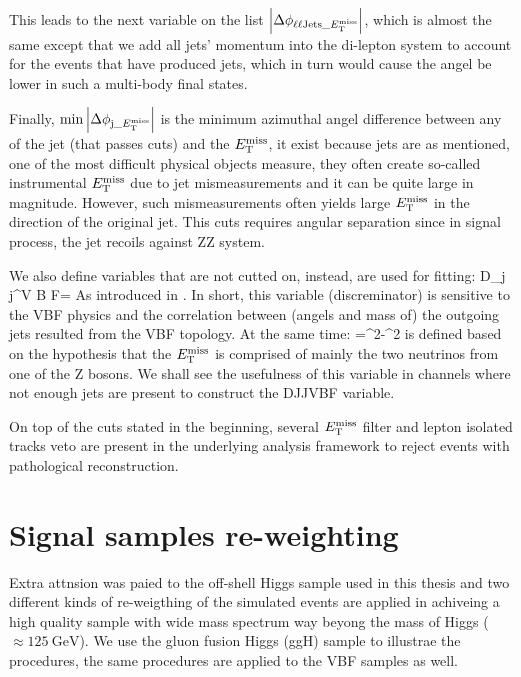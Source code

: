 This leads to the next variable on the list $\abs{\Delta\phi_{\ell\ell\mathrm{Jets}\_E_{\mathrm{T}}^{\mathrm{miss}}}}$, which
is almost the same except that we add all jets' momentum into the di-lepton system to account
for the events that have produced jets, which in turn would cause the angel be lower in such
a multi-body final states.

Finally, $\min{\abs{ \Delta\phi_{\mathrm{j}\_E_{\mathrm{T}}^{\mathrm{miss}}}}}$ is the minimum azimuthal angel difference between
any of the jet (that passes cuts) and the $E_{\mathrm{T}}^{\mathrm{miss}}$, it exist because jets are as mentioned, one of the 
most difficult physical objects measure, they often create so-called instrumental $E_{\mathrm{T}}^{\mathrm{miss}}$ due to jet
mismeasurements and it can be quite large in magnitude. However, such mismeasurements often yields large
$E_{\mathrm{T}}^{\mathrm{miss}}$ in the direction of the original jet. This cuts requires angular separation since in signal process,
the jet recoils against ZZ system.

We also define variables that are not cutted on, instead, are used for fitting:
\be
D_{j j}^{V B F}=
\ee
As introduced in \cite{hig-18-002}. In short, this variable (discreminator) is sensitive
to the VBF physics and the correlation between (angels and mass of) the outgoing jets resulted from the
VBF topology. At the same time:
\be
\mtzz={}^2-^{2}
\ee
is defined based on the hypothesis that the $E_{\mathrm{T}}^{\mathrm{miss}}$ is comprised of mainly the two neutrinos
from one of the Z bosons. We shall see the usefulness of this variable in channels where
not enough jets are present to construct the DJJVBF variable.

On top of the cuts stated in the beginning, several $E_{\mathrm{T}}^{\mathrm{miss}}$ filter and lepton isolated tracks veto
are present in the underlying analysis framework to reject events with pathological reconstruction.

\section{Signal samples re-weighting}
\label{sec:sig_rewgt}
Extra attnsion was paied to the off-shell Higgs sample used in this thesis and two different kinds
of re-weigthing of the simulated events are applied in achiveing a high quality sample with wide
mass spectrum way beyong the mass of Higgs ($\approx \SI{125}{\giga\electronvolt}$). We use the
gluon fusion Higgs (ggH) sample to illustrae the procedures, the same procedures are applied to
the VBF samples as well.

